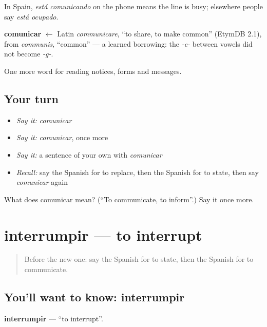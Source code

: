 In Spain, \emph{está comunicando} on the phone means the line is busy; elsewhere people say \emph{está ocupado}.

\begin{cousinweb}
\textbf{comunicar} $\leftarrow$ Latin \emph{communicare}, \textquotedblleft{}to share, to make common\textquotedblright{} (EtymDB 2.1), from \emph{communis}, \textquotedblleft{}common\textquotedblright{} — a learned borrowing: the \emph{-c-} between vowels did not become \emph{-g-}.
\end{cousinweb}

\begin{grammarlens}[title={What you've built}]
One more word for reading notices, forms and messages.
\end{grammarlens}

\subsection*{Your turn}
\begin{itemize}
\raggedright
  \item \emph{Say it:} \emph{comunicar}
  \item \emph{Say it:} \emph{comunicar}, once more
  \item \emph{Say it:} a sentence of your own with \emph{comunicar}
  \item \emph{Recall:} say the Spanish for to replace, then the Spanish for to state, then say \emph{comunicar} again
\end{itemize}

\begin{tcolorbox}[breakable,colback=teal!4,colframe=teal!35!black,title={Before you move on}]
What does comunicar mean? (\textquotedblleft{}To communicate, to inform\textquotedblright{}.) Say it once more.
\end{tcolorbox}
\section[interrumpir]{interrumpir — to interrupt}

\label{lesson:ES-C480-interrumpir}



\begin{quote}
Before the new one: say the Spanish for to state, then the Spanish for to communicate.
\end{quote}

\subsection*{You'll want to know: interrumpir}
\textbf{interrumpir} — \textquotedblleft{}to interrupt\textquotedblright{}.

